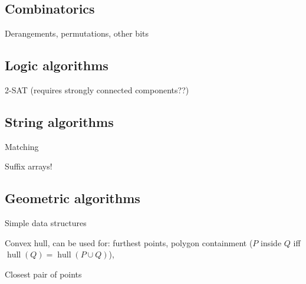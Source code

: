 \documentclass[10pt,a4paper]{article}
\newcommand{\codelisting}[1]{
  }
\begin{document}
\subsection*{Combinatorics}
Derangements, permutations, other bits

\subsection*{Logic algorithms}
2-SAT (requires strongly connected components??)
\codelisting{2sat.java}

\subsection*{String algorithms}
Matching
\codelisting{kmp.java}


Suffix arrays!
\codelisting{suffix.java}

\subsection*{Geometric algorithms}
Simple data structures
\codelisting{Point.java}
Convex hull, can be used for: furthest points, polygon containment ($P$ inside $Q$ iff $\operatorname{hull}(Q)  = \operatorname{hull}(P\cup Q)$),
\codelisting{convexhull.java}

Closest pair of points
\codelisting{closestpoints.java}
\end{document}
